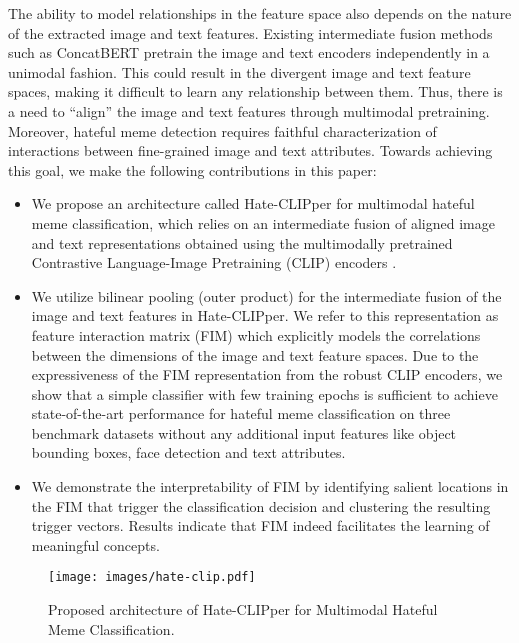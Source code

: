 \documentclass[11pt]{article}
\begin{document}
The ability to model relationships in the feature space also depends on the nature of the extracted image and text features. Existing intermediate fusion methods such as ConcatBERT \citep{kiela2020hateful} pretrain the image and text encoders independently in a unimodal fashion. This could result in the divergent image and text feature spaces, making it difficult to learn any relationship between them. Thus, there is a need to ``align'' the image and text features through multimodal pretraining. Moreover, hateful meme detection requires faithful characterization of interactions between fine-grained image and text attributes. Towards achieving this goal, we make the following contributions in this paper:

\begin{itemize}
\item We propose an architecture called Hate-CLIPper for multimodal hateful meme classification, which relies on an intermediate fusion of aligned image and text representations obtained using the multimodally pretrained Contrastive Language-Image Pretraining (CLIP) encoders \citep{radford2021learning}. 

\item We utilize bilinear pooling (outer product) for the intermediate fusion of the image and text features in Hate-CLIPper. We refer to this representation as feature interaction matrix (FIM) which explicitly models the correlations between the dimensions of the image and text feature spaces. Due to the expressiveness of the FIM representation from the robust CLIP encoders, we show that a simple classifier with few training epochs is sufficient to achieve state-of-the-art performance for hateful meme classification on three benchmark datasets without any additional input features like object bounding boxes, face detection and text attributes.

\item We demonstrate the interpretability of FIM by identifying salient locations in the FIM that trigger the classification decision and clustering the resulting trigger vectors. Results indicate that FIM indeed facilitates the learning of meaningful concepts.  
\end{itemize}




\begin{figure*}[t]
\centering
   \texttt{[image: images/hate-clip.pdf]}
   \caption{Proposed architecture of Hate-CLIPper for Multimodal Hateful Meme Classification.}
   \label{fig:hate-clip}
\end{figure*}
\end{document}
